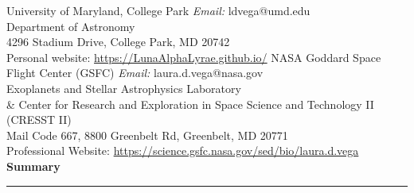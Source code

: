 \documentclass[12pt]{article}
\begin{document}
{\noindent University of Maryland, College Park \hfill \textit{Email:} ldvega@umd.edu \\
\noindent Department of Astronomy \hfill \\
4296 Stadium Drive, College Park, MD 20742 \hfill \\
Personal website: \href{https://LunaAlphaLyrae.github.io/}{https://LunaAlphaLyrae.github.io/}
\vskip 0.1in
\noindent NASA Goddard Space Flight Center (GSFC) \hfill \textit{Email:} laura.d.vega@nasa.gov \\ 
Exoplanets and Stellar Astrophysics Laboratory \\ \& Center for Research and Exploration in Space Science and Technology II (CRESST II) \hfill \\
Mail Code 667, 8800 Greenbelt Rd, Greenbelt, MD 20771 \\
Professional Website: \href{https://science.gsfc.nasa.gov/sed/bio/laura.d.vega}{https://science.gsfc.nasa.gov/sed/bio/laura.d.vega} \\


}
\noindent
{\bf Summary} \\
\vspace{-10mm}
\begin{center}
\rule{\textwidth}{0.2mm}
\end{center}
\vspace{-3mm}

\end{document}
